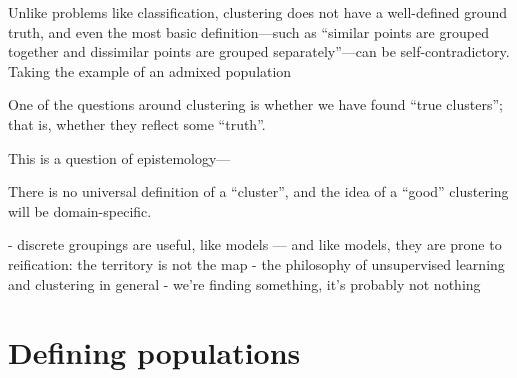Unlike problems like classification, clustering does not have a well-defined ground truth, and even the most basic definition---such as ``similar points are grouped together and dissimilar points are grouped separately''---can be self-contradictory\citep{ben-david_clustering_2018}. Taking the example of an admixed population

One of the questions around clustering is whether we have found ``true clusters''; that is, whether they reflect some ``truth''. 

This is a question of epistemology---

There is no universal definition of a ``cluster'', and the idea of a ``good'' clustering will be domain-specific\citep{hennig_what_2015}.

- discrete groupings are useful, like models --- and like models, they are prone to reification: the territory is not the map
- the philosophy of unsupervised learning and clustering in general
- we're finding something, it's probably not nothing


\clearpage

\section{Defining populations}

